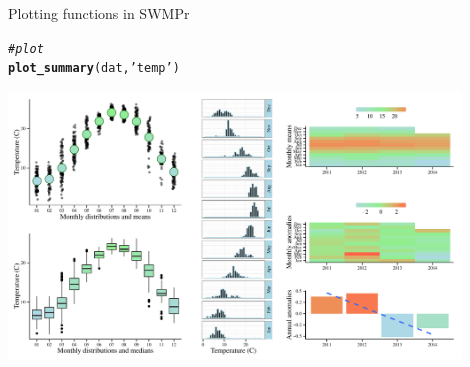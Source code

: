 \documentclass[xcolor=dvipsnames]{beamer}\usepackage[]{graphicx}\usepackage[]{color}
\makeatletter
\newcommand{\hlstr}[1]{\textcolor[rgb]{0.192,0.494,0.8}{#1}}%
\newcommand{\hlcom}[1]{\textcolor[rgb]{0.678,0.584,0.686}{\textit{#1}}}%
\newcommand{\hlstd}[1]{\textcolor[rgb]{0.345,0.345,0.345}{#1}}%
\newcommand{\hlkwd}[1]{\textcolor[rgb]{0.737,0.353,0.396}{\textbf{#1}}}%
\newenvironment{kframe}{%
 \def\at@end@of@kframe{}%
 \ifinner\ifhmode%
  \def\at@end@of@kframe{\end{minipage}}%
  \begin{minipage}{\columnwidth}%
 \fi\fi%
 \def\FrameCommand##1{\hskip\@totalleftmargin \hskip-\fboxsep
 \colorbox{shadecolor}{##1}\hskip-\fboxsep
     \hskip-\linewidth \hskip-\@totalleftmargin \hskip\columnwidth}%
 \MakeFramed {\advance\hsize-\width
   \@totalleftmargin\z@ \linewidth\hsize
   \@setminipage}}%
 {\par\unskip\endMakeFramed%
 \at@end@of@kframe}
\newenvironment{knitrout}{}{} %
\makeatother
\begin{document}
\begin{frame}[fragile, t]{Plotting functions in SWMPr}

\begin{knitrout}\scriptsize
{}\color{fgcolor}\begin{kframe}
\begin{alltt}
\hlcom{# plot}
\hlkwd{plot_summary}\hlstd{(dat,} \hlstr{'temp'}\hlstd{)}
\end{alltt}
\end{kframe}

{\centering \includegraphics[width=0.9\textwidth]{figure/unnamed-chunk-32-1} 

}



\end{knitrout}
\end{frame}
\end{document}
